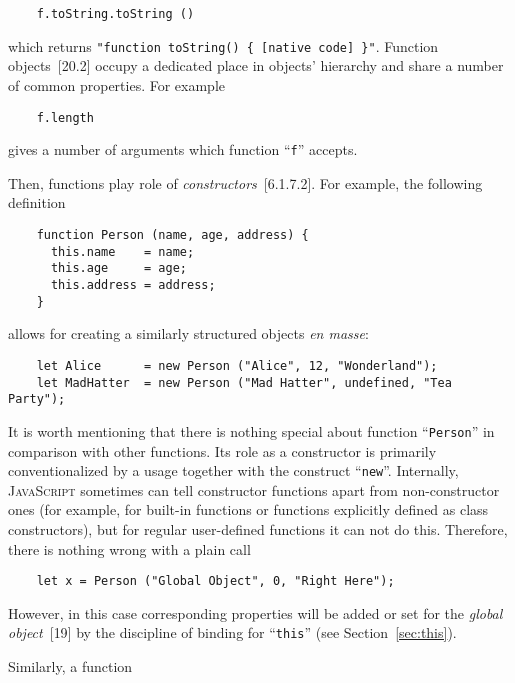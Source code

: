 \documentclass{article}
\newcommand{\js}{\textsc{JavaScript}\xspace}
\newcommand{\rf}[1]{[\textsc{#1}]}
\newcommand{\out}[1]{\texttt{#1}}
\begin{document}
\begin{lstlisting}
    f.toString.toString ()
\end{lstlisting}

which returns \out{"function toString() \{ [native code] \}"}. Function objects~\rf{20.2} occupy a dedicated place in objects' hierarchy
and share a number of common properties. For example

\begin{lstlisting}
    f.length
\end{lstlisting}

gives a number of arguments which function ``\lstinline|f|'' accepts.

Then, functions play role of \emph{constructors}~\rf{6.1.7.2}. For example, the following definition

\begin{lstlisting}
    function Person (name, age, address) {
      this.name    = name;
      this.age     = age;
      this.address = address;
    }
\end{lstlisting}

allows for creating a similarly structured objects \emph{en masse}:

\begin{lstlisting}
    let Alice      = new Person ("Alice", 12, "Wonderland");
    let MadHatter  = new Person ("Mad Hatter", undefined, "Tea Party");  
\end{lstlisting}

It is worth mentioning that there is nothing special about function ``\lstinline|Person|'' in
comparison with other functions. Its role as a constructor is primarily conventionalized
by a usage together with the construct ``\lstinline|new|''. Internally, \js sometimes can
tell constructor functions apart from non-constructor ones (for example, for built-in functions or
functions explicitly defined as class constructors), but for regular user-defined functions
it can not do this. Therefore, there is nothing wrong with a plain call

\begin{lstlisting}
    let x = Person ("Global Object", 0, "Right Here");
\end{lstlisting}

However, in this case corresponding properties will be added or set for the \emph{global object}~\rf{19} by
the discipline of binding for ``\lstinline|this|'' (see Section~\ref{sec:this}).

Similarly, a function
\end{document}
